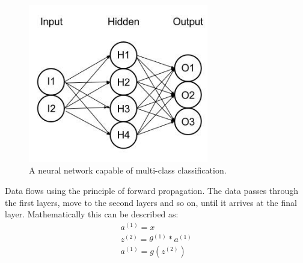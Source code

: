 \begin{figure}[H]
\centering
\includegraphics[width=0.7\textwidth]{Figures/neuralnetmulti}
\decoRule
\caption[Neural network with multi-class classification]{A neural network capable of multi-class classification. \cite{neuralnetworkmult}}
\label{fig:neuralnetworkmult}
\end{figure}
\noindent Data flows using the principle of forward propagation. The data passes through the first layers, move to the second layers and so on, until it arrives at the final layer. Mathematically this can be described as: 
\begin{align*}
a^{(1)} = x\\
z^{(2)} = \theta^{(1)}*a^{(1)}\\
a^{(1)} = g(z^{(2)})
\end{align*}
